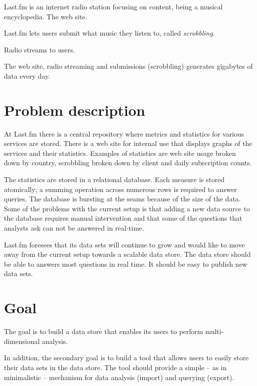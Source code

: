 Last.fm is an internet radio station focusing on content, being a musical
encyclopedia. The web site.

Last.fm lets users submit what music they listen to, called \textit{scrobbling}.

Radio streams to users.

The web site, radio streaming and submissions (scrobbling) generates gigabytes
of data every day.



\section{Problem description}

At Last.fm there is a central repository where metrics and statistics for
various services are stored. There is a web site for internal use that
displays graphs of the services and their statistics. Examples of statistics
are web site usage broken down by country, scrobbling broken down by client
and daily subscription counts.

The statistics are stored in a relational database. Each measure is stored
atomically; a summing operation across numerous rows is required to answer
queries. The database is bursting at the seams because of the size of the
data. Some of the problems with the current setup is that adding a new data
source to the database requires manual intervention and that some of the
questions that analysts ask can not be answered in real-time.

Last.fm foresees that its data sets will continue to grow and would like to
move away from the current setup towards a scalable data store. The data store
should be able to answers most questions in real time. It should be easy
to publish new data sets.


\section{Goal}


The goal is to build a data store that enables its users to perform
multi-dimensional analysis.

In addition, the secondary goal is to build a tool that allows users to easily
store their data sets in the data store. The tool should provide a simple – as
in minimalistic – mechanism for data analysis (import) and querying (export).

